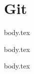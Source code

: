 \section{Git}

\ifdefined\multipleRepos
{body.tex}
\fi

\ifdefined\addingRemote
{body.tex}
\fi

\ifdefined\gitConfig
{body.tex}
\fi